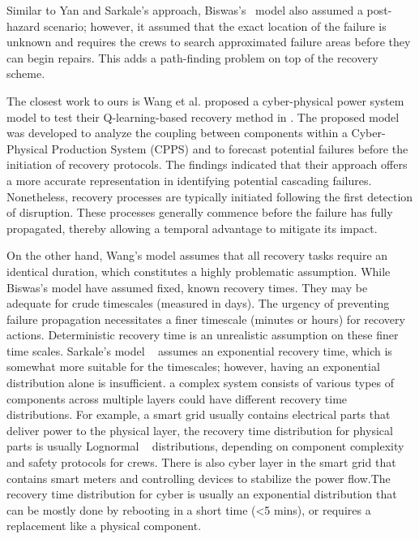 \documentclass[conference]{IEEEtran}
\begin{document}
Similar to Yan and Sarkale's approach, Biswas's~\cite{biswas_repair_2025} model also assumed a post-hazard scenario; however, it assumed that the exact location of the failure is unknown and requires the crews to search approximated failure areas before they can begin repairs. This adds a path-finding problem on top of the recovery scheme. 


The closest work to ours is Wang et al. proposed a cyber-physical power system model to test their Q-learning-based recovery method in \cite{wang_q-learning-based_2025}. The proposed model was developed to analyze the coupling between components within a Cyber-Physical Production System (CPPS) and to forecast potential failures before the initiation of recovery protocols. The findings indicated that their approach offers a more accurate representation in identifying potential cascading failures. Nonetheless, recovery processes are typically initiated following the first detection of disruption. These processes generally commence before the failure has fully propagated, thereby allowing a temporal advantage to mitigate its impact.

On the other hand, Wang's model\cite{wang_q-learning-based_2025} assumes that all recovery tasks require an identical duration, which constitutes a highly problematic assumption. While Biswas's \cite{biswas_repair_2025} model have assumed fixed, known recovery times. They may be adequate for crude timescales (measured in days). The urgency of preventing failure propagation necessitates a finer timescale (minutes or hours) for recovery actions. Deterministic recovery time is an unrealistic assumption on these finer time scales. Sarkale's model ~\cite{yan_dynamic_2021} assumes an exponential recovery time, which is somewhat more suitable for the timescales; however, having an exponential distribution alone is insufficient. a complex system consists of various types of components across multiple layers could have different recovery time distributions. For example, a smart grid usually contains electrical parts that deliver power to the physical layer, the recovery time distribution for physical parts is usually Lognormal ~\cite{l_c_cadwallader_review_2012} distributions, depending on component complexity and safety protocols for crews.  There is also cyber layer in the smart grid that contains smart meters and controlling devices to stabilize the power flow.The recovery time distribution for cyber is usually an exponential distribution that can be mostly done by rebooting in a short time (<5 mins), or requires a replacement like a physical component.
\end{document}
